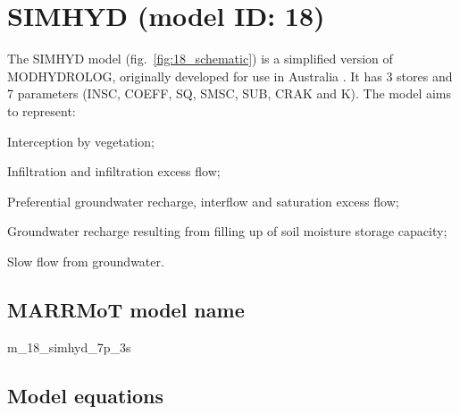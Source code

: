 \section{SIMHYD (model ID: 18)}
The SIMHYD model (fig.~\ref{fig:18_schematic}) is a simplified version of MODHYDROLOG, originally developed for use in Australia \citep{Chiew2002}. It has 3 stores and 7 parameters (INSC, COEFF, SQ, SMSC, SUB, CRAK and K). The model aims to represent:

\begin{itemizecompact}
\item Interception by vegetation;
\item Infiltration and infiltration excess flow;
\item Preferential groundwater recharge, interflow and saturation excess flow;
\item Groundwater recharge resulting from filling up of soil moisture storage capacity;
\item Slow flow from groundwater.
\end{itemizecompact}

\subsection{MARRMoT model name}
m\_18\_simhyd\_7p\_3s \\

\subsection{Model equations}

